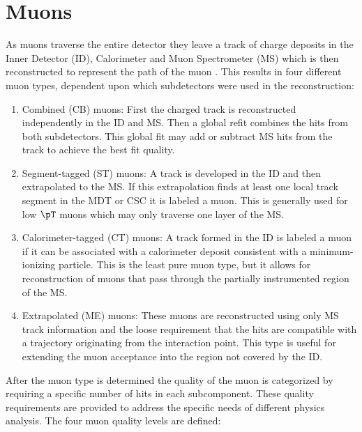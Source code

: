 \section{Muons} \label{sec:objects:muons}

As muons traverse the entire detector they leave a track of charge deposits in
the Inner Detector (ID), Calorimeter and Muon Spectrometer (MS) which is then
reconstructed to represent the path of the muon \cite{Aad:2016jkr}. This
results in four different muon types, dependent upon which subdetectors were
used in the reconstruction:

\begin{enumerate}
  \item Combined (CB) muons: First the charged track is reconstructed independently in the ID and MS.  Then a global refit combines the hits from both subdetectors. This global fit may add or subtract MS hits from the track to achieve the best fit quality.
  \item Segment-tagged (ST) muons: A track is developed in the ID and then extrapolated to the MS.  If this extrapolation finds at least one local track segment in the MDT or CSC it is labeled a muon.  This is generally used for low $\pT$ muons which may only traverse one layer of the MS.
  \item Calorimeter-tagged (CT) muons: A track formed in the ID is labeled a muon if it can be associated with a calorimeter deposit consistent with a minimum-ionizing particle.  This is the least pure muon type, but it allows for reconstruction of muons that pass through the partially instrumented region of the MS.
  \item Extrapolated (ME) muons: These muons are reconstructed using only MS track information and the loose requirement that the hits are compatible with a trajectory originating from the interaction point.  This type is useful for extending the muon acceptance into the region not covered by the ID.
\end{enumerate}

After the muon type is determined the quality of the muon is categorized by
requiring a specific number of hits in each subcomponent.  These quality
requirements are provided to address the specific needs of different physics
analysis. The four muon quality levels are defined:


